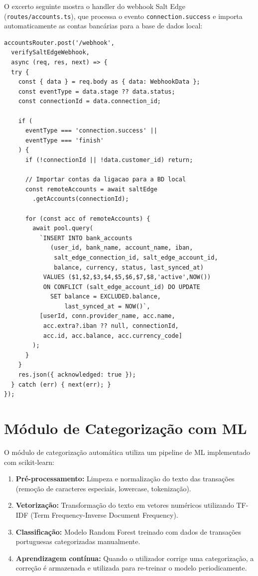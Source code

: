 O excerto seguinte mostra o handler do webhook Salt Edge (\texttt{routes/accounts.ts}), que processa o evento \texttt{connection.success} e importa automaticamente as contas bancárias para a base de dados local:

\begin{lstlisting}[caption={Handler do webhook Salt Edge — importação automática de contas.},label={lst:saltedge-webhook}]
accountsRouter.post('/webhook',
  verifySaltEdgeWebhook,
  async (req, res, next) => {
  try {
    const { data } = req.body as { data: WebhookData };
    const eventType = data.stage ?? data.status;
    const connectionId = data.connection_id;

    if (
      eventType === 'connection.success' ||
      eventType === 'finish'
    ) {
      if (!connectionId || !data.customer_id) return;

      // Importar contas da ligacao para a BD local
      const remoteAccounts = await saltEdge
        .getAccounts(connectionId);

      for (const acc of remoteAccounts) {
        await pool.query(
          `INSERT INTO bank_accounts
             (user_id, bank_name, account_name, iban,
              salt_edge_connection_id, salt_edge_account_id,
              balance, currency, status, last_synced_at)
           VALUES ($1,$2,$3,$4,$5,$6,$7,$8,'active',NOW())
           ON CONFLICT (salt_edge_account_id) DO UPDATE
             SET balance = EXCLUDED.balance,
                 last_synced_at = NOW()`,
          [userId, conn.provider_name, acc.name,
           acc.extra?.iban ?? null, connectionId,
           acc.id, acc.balance, acc.currency_code]
        );
      }
    }
    res.json({ acknowledged: true });
  } catch (err) { next(err); }
});
\end{lstlisting}


\section{Módulo de Categorização com ML}
\label{sec:impl-ml}

O módulo de categorização automática utiliza um pipeline de \ac{ML} implementado com scikit-learn:

\begin{enumerate}
    \item \textbf{Pré-processamento:} Limpeza e normalização do texto das transações (remoção de caracteres especiais, lowercase, tokenização).
    \item \textbf{Vetorização:} Transformação do texto em vetores numéricos utilizando TF-IDF (Term Frequency-Inverse Document Frequency).
    \item \textbf{Classificação:} Modelo Random Forest treinado com dados de transações portuguesas categorizadas manualmente.
    \item \textbf{Aprendizagem contínua:} Quando o utilizador corrige uma categorização, a correção é armazenada e utilizada para re-treinar o modelo periodicamente.
\end{enumerate}

